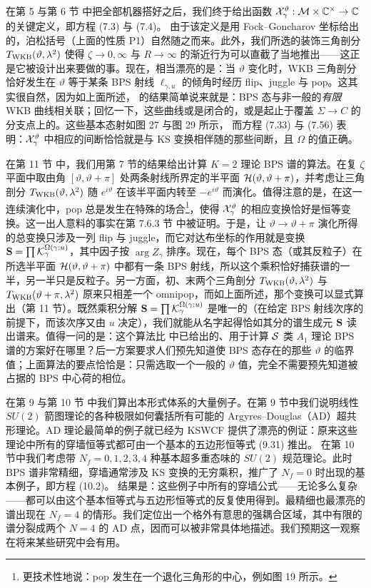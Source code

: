 在第 5 与第 6 节%
中把全部机器搭好之后，我们终于给出函数 $\mathcal{X}^{\vartheta}_\gamma:\mathcal{M} \times \mathbb{C}^\times \to \mathbb{C}$ 的关键定义，即方程 (7.3) 与 (7.4)。%
由于该定义是用 Fock–Goncharov 坐标给出的，泊松括号（上面的性质 P1）自然随之而来。此外，我们所选的装饰三角剖分 $T_{\rm WKB}(\vartheta, \lambda^2)$ 使得 $\zeta \to 0, \infty$ 与 $R \to \infty$ 的渐近行为可以直截了当地推出——这正是它被设计出来要做的事。现在，相当漂亮的是：当 $\vartheta$ 变化时，WKB 三角剖分恰好发生在 $\vartheta$ 等于某条 BPS 射线 $\ell_{\gamma,u}$ 的倾角时经历 flip、juggle 与 pop。这其实很自然，因为如上面所述，\cite{Klemm:1996bj} 的结果简单说来就是：BPS 态与非一般的\emph{有限} WKB 曲线相关联；回忆一下，这些曲线或是闭合的，或是起止于覆盖 $\Sigma \to C$ 的分支点上的。这些基本态射如图 27 与图 29 所示，%
而方程 (7.33) 与 (7.56) 表明：$\mathcal{X}^{\vartheta}_{\gamma}$ 中相应的间断恰恰就是与 KS 变换相伴随的那些间断，且 $\Omega$ 的值正确。

在第 11 节%
中，我们用第 7 节的结果给出计算 $K=2$ 理论 BPS 谱的算法。在复 $\zeta$ 平面中取由角 $[\vartheta, \vartheta + \pi]$ 处两条射线所界定的半平面 $\mathcal{H}(\vartheta,\vartheta+\pi)$，并考虑让三角剖分 $T_{\rm WKB}(\vartheta,\lambda^2)$ 随 $e^{i\vartheta}$ 在该半平面内转至 $-e^{i \vartheta}$ 而演化。值得注意的是，在这一连续演化中，pop 总是发生在特殊的场合\footnote{更技术性地说：pop 发生在一个退化三角形的中心，例如图 19 所示。}，使得 $\mathcal{X}^{\vartheta}_{\gamma}$ 的相应变换恰好是恒等变换。这一出人意料的事实在第 7.6.3 节%
中被证明。于是，让 $\vartheta \to \vartheta + \pi$ 演化所得的总变换只涉及一列 flip 与 juggle，而它对达布坐标的作用就是变换 ${\bf S} = \prod \mathcal{K}_{\gamma}^{\Omega(\gamma;u)}$，其中因子按 $\arg Z_\gamma$ 排序。现在，每个 BPS 态（或其反粒子）在所选半平面 $\mathcal{H}(\vartheta,\vartheta+\pi)$ 中都有一条 BPS 射线，所以这个乘积恰好捕获谱的一半，另一半只是反粒子。另一方面，初、末两个三角剖分 $T_{\rm WKB}(\vartheta, \lambda^2)$ 与 $T_{\rm WKB}(\vartheta+\pi,\lambda^2)$ 原来只相差一个 omnipop，而如上面所述，那个变换可以显式算出（第 11 节）。既然乘积分解 ${\bf S} = \prod \mathcal{K}_{\gamma}^{\Omega(\gamma;u)}$ 是唯一的（在给定 BPS 射线次序的前提下，而该次序又由 $u$ 决定），我们就能从名字起得恰如其分的谱生成元 ${\bf S}$ 读出谱来。值得一问的是：这个算法比 \cite{Klemm:1996bj} 中已给出的、用于计算 $\mathcal{S}$ 类 $A_1$ 理论 BPS 谱的方案好在哪里？后一方案要求人们预先知道使 BPS 态存在的那些 $\vartheta$ 的临界值；上面算法的要点恰恰是：只需选取一个一般的 $\vartheta$ 值，完全不需要预先知道被占据的 BPS 中心荷的相位。

在第 9 与第 10 节%
中我们算出本形式体系的大量例子。在第 9 节中我们说明线性 $SU(2)$ 箭图理论的各种极限如何囊括所有可能的 Argyres–Douglas（AD）超共形理论。AD 理论最简单的例子就已经为 KSWCF 提供了漂亮的例证：原来这些理论中所有的穿墙恒等式都可由一个基本的五边形恒等式 (9.31) 推出。%
在第 10 节中我们考虑带 $N_f=0,1,2,3,4$ 种基本超多重态味的 $SU(2)$ 规范理论。此时 BPS 谱非常精细，穿墙通常涉及 KS 变换的无穷乘积，推广了 $N_f=0$ 时出现的基本例子，即方程 (10.2)。%
结果是：这些例子中所有的穿墙公式——无论多么复杂——都可以由这个基本恒等式与五边形恒等式的反复使用得到。最精细也最漂亮的谱出现在 $N_f=4$ 的情形。我们定位出一个格外有意思的强耦合区域，其中有限的谱分裂成两个 $N=4$ 的 AD 点，因而可以被非常具体地描述。我们预期这一观察在将来某些研究中会有用。

